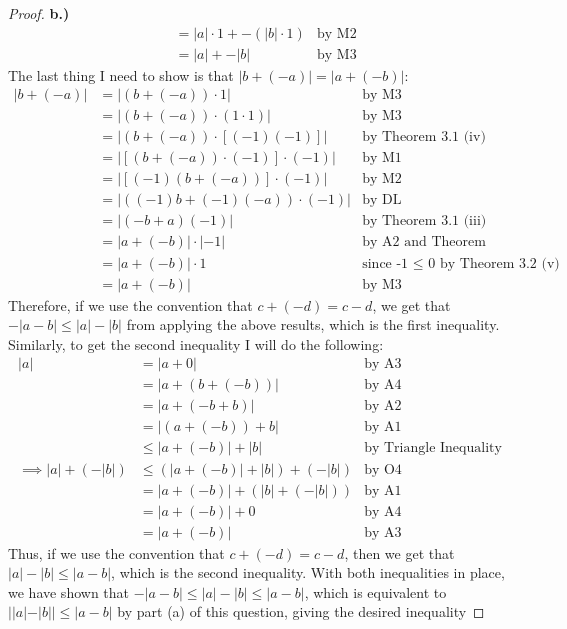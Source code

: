 \documentclass[10pt,a4paper]{article}
\theoremstyle{definition}
\begin{document}
\begin{proof}{\textbf{b.)}}
\begin{align*}
&= |a| \cdot 1 + -(|b| \cdot 1) &\text{by M2}\\
&= |a| + -|b| &\text{by M3}
\end{align*}
The last thing I need to show is that $|b + (-a)| = |a + (-b)|$:
\begin{align*}
|b + (-a)| &= |(b + (-a)) \cdot 1| &\text{by M3}\\
&= |(b + (-a)) \cdot (1 \cdot 1)| &\text{by M3}\\
&= |(b + (-a)) \cdot [(-1)(-1)]| &\text{by Theorem 3.1 (iv)}\\
&= |[(b + (-a)) \cdot (-1)] \cdot (-1)| &\text{by M1}\\
&= |[(-1)(b + (-a))] \cdot (-1)| &\text{by M2}\\
&= |((-1)b + (-1)(-a)) \cdot (-1)| &\text{by DL}\\
&= |(-b + a)(-1)| &\text{by Theorem 3.1 (iii) and (iv)}\\
&= |a + (-b)|\cdot|-1| &\text{by A2 and Theorem 3.5 (ii)}\\
&= |a + (-b)| \cdot 1 &\text{since -1 $\leq$ 0 by Theorem 3.2 (v) and (i)}\\
&= |a + (-b)| &\text{by M3}
\end{align*}
Therefore, if we use the convention that $c + (-d) = c - d$, we get that $-|a-b| \leq |a| - |b|$ from applying the above results, which is the first inequality. Similarly, to get the second inequality I will do the following:
\begin{align*}
|a| &= |a + 0| &\text{by A3}\\
&= |a + (b + (-b))| &\text{by A4}\\
&= |a + (-b + b)| &\text{by A2}\\
&= |(a + (-b)) + b| &\text{by A1}\\
&\leq |a + (-b)| + |b| &\text{by Triangle Inequality}\\
\implies |a| + (-|b|) &\leq (|a + (-b)| + |b|) + (-|b|) &\text{by O4}\\
&= |a + (-b)| + (|b| + (-|b|)) &\text{by A1}\\
&= |a + (-b)| + 0 &\text{by A4}\\
&= |a + (-b)| &\text{by A3}
\end{align*}
Thus, if we use the convention that $c + (-d) = c - d$, then we get that $|a| - |b| \leq |a - b|$, which is the second inequality. With both inequalities in place, we have shown that $-|a-b| \leq |a| - |b| \leq |a - b|$, which is equivalent to $||a| - |b|| \leq |a - b|$ by part (a) of this question, giving the desired inequality
\end{proof}
\end{document}
